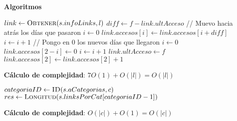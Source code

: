\documentclass[10pt, a4paper]{article}
\let\TipoVariable=\texttt
\let\ModificadorArgumento=\textbf
\newcommand{\In}[2]{\ModificadorArgumento{in} \ensuremath{#1}\,: \TipoVariable{#2}\xspace}
\newcommand{\Inout}[2]{\ModificadorArgumento{in/out} \ensuremath{#1}\,: \TipoVariable{#2}\xspace}
\newenvironment{Servicios Usados}{%
  \vspace*{2ex}
  \noindent\textbf{\Large Servicios Usados}%
  \vspace*{2ex}
}{}
\newenvironment{Algoritmos}{%
  \vspace*{2ex}%
  \noindent\textbf{\Large Algoritmos}%
  \vspace*{2ex}%
}{}
\newenvironment{Algoritmos Del Iterador}{%
  \vspace*{2ex}%
  \noindent\textbf{\Large Algoritmos Del Iterador}%
  \vspace*{2ex}%
}{}
\newcommand{\DRef}{\ensuremath{\rightarrow}}
\begin{document}
\begin{Algoritmos}
\begin{algorithm}[H]
\caption*{iAccederLink(\Inout{s}{LinkLinkIt}, \In{l}{link}, \In{f}{fecha})}
\begin{algorithmic}[1]
	\State $link \gets \Call{Obtener}{s.infoLinks, l}$
    \State $diff \gets f - link.ultAcceso$
    \Statex
    \Statex // Muevo hacia atr\'as los d\'ias que pasaron
    \State $i \gets 0$
        \State $link.accesos[i] \gets link.accesos[i + diff]$
        \State $i \gets i + 1$
    \EndWhile
    \Statex
    \Statex // Pongo en 0 los nuevos d\'ias que llegaron
    \State $i \gets 0$
        \State $link.accesos[2 - i] \gets 0$
        \State $i \gets i + 1$
    \EndWhile
    \Statex
    \State $link.ultAcceso \gets f$
    \State $link.accesos[2] \gets link.accesos[2] + 1$
\end{algorithmic}
\textbf{C\'alculo de complejidad}: $7O(1) + O(|l|) = O(|l|)$
\end{algorithm}

\begin{algorithm}[H]
\caption*{iCantLinks(\In{s}{LinkLinkIt}, \In{c}{categoria}) $\DRef res$ : \TipoVariable{Nat}}
\begin{algorithmic}[1]
	\State $categoriaID \gets \Call{ID}{s.aCategorias, c}$
	\State $res \gets \Call{Longitud}{s.linksPorCat[categoriaID-1]}$
\end{algorithmic}
\textbf{C\'alculo de complejidad}: $O(|c|) + O(1) = O(|c|)$
\end{algorithm}


\end{Algoritmos}
\end{document}
